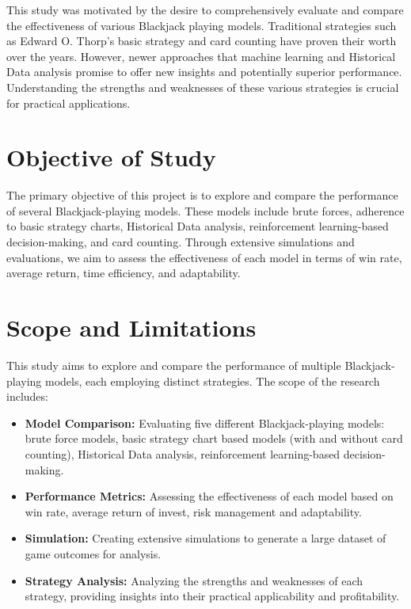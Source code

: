 \documentclass[a4paper,12pt]{report}
\begin{document}
This study was motivated by the desire to comprehensively evaluate and compare the effectiveness of various Blackjack playing models. Traditional strategies such as Edward O. Thorp's basic strategy and card counting have proven their worth over the years. However, newer approaches that machine learning and Historical Data analysis promise to offer new insights and potentially superior performance. Understanding the strengths and weaknesses of these various strategies is crucial for practical applications.

\section{Objective of Study} The primary objective of this project is to explore and compare the performance of several Blackjack-playing models. These models include brute forces, adherence to basic strategy charts, Historical Data analysis, reinforcement learning-based decision-making, and card counting. Through extensive simulations and evaluations, we aim to assess the effectiveness of each model in terms of win rate, average return, time efficiency, and adaptability.

\baselineskip

\section{Scope and Limitations}
This study aims to explore and compare the performance of multiple Blackjack-playing models, each employing distinct strategies. The scope of the research includes:

\begin{itemize}
\item \textbf{Model Comparison:} Evaluating five different Blackjack-playing models: brute force models, basic strategy chart based models (with and without card counting), Historical Data analysis, reinforcement learning-based decision-making.
\item \textbf{Performance Metrics:} Assessing the effectiveness of each model based on win rate, average return of invest, risk management and adaptability.
\item \textbf{Simulation:} Creating extensive simulations to generate a large dataset of game outcomes for analysis.
\item \textbf{Strategy Analysis:} Analyzing the strengths and weaknesses of each strategy, providing insights into their practical applicability and profitability.
\end{itemize} 
\end{document}
